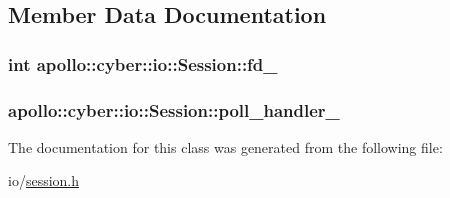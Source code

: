\subsection{Member Data Documentation}
\hypertarget{classapollo_1_1cyber_1_1io_1_1Session_a188d2acea391719dc4c81e9ded481fec}{
\subsubsection[{fd\-\_\-}]{\setlength{\rightskip}{0pt plus 5cm}int apollo\-::cyber\-::io\-::\-Session\-::fd\-\_\-\hspace{0.3cm}{\ttfamily [private]}}}\label{classapollo_1_1cyber_1_1io_1_1Session_a188d2acea391719dc4c81e9ded481fec}
\hypertarget{classapollo_1_1cyber_1_1io_1_1Session_a38513802b0eb309fc7b34749859eb87c}{
\subsubsection[{poll\-\_\-handler\-\_\-}]{ apollo\-::cyber\-::io\-::\-Session\-::poll\-\_\-handler\-\_\-\hspace{0.3cm}{\ttfamily [private]}}}\label{classapollo_1_1cyber_1_1io_1_1Session_a38513802b0eb309fc7b34749859eb87c}


The documentation for this class was generated from the following file\-:\begin{DoxyCompactItemize}
\item 
io/\hyperlink{session_8h}{session.\-h}\end{DoxyCompactItemize}
